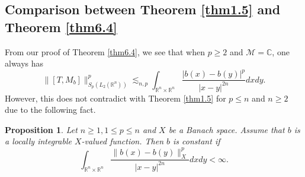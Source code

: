 \documentclass[oneside,english,a4wide]{amsart}
\numberwithin{equation}{section}
\numberwithin{figure}{section}
\theoremstyle{plain}
\theoremstyle{plain}
\newtheorem{proposition}[thm]{Proposition}
\theoremstyle{definition}
\theoremstyle{plain}
\theoremstyle{remark}
\theoremstyle{definition}
\theoremstyle{remark}
\theoremstyle{definition}
\newcommand{\M}{{\mathcal M}}
\newcommand{\8}{\infty}
\begin{document}
\subsection{Comparison between  Theorem \ref{thm1.5} and Theorem \ref{thm6.4}}
From our proof of Theorem \ref{thm6.4}, we see that when $p\geq 2$ and $\M=\mathbb{C}$, one always has
$$ \|[T,M_b]\|^p_{S_p(L_2(\mathbb{R}^n))}\lesssim_{n, p} \int_{\mathbb{R}^n\times\mathbb{R}^n}\frac{|b(x)-b(y)|^p}{|x-y|^{2n}}dxdy. $$
However, this does not contradict with Theorem \ref{thm1.5} for $p\leq n$ and $n\geq 2$ due to the following fact.
\begin{proposition}\label{0pn}
	Let $n\ge 1, 1\leq p\leq n$ and $X$ be a Banach space. Assume that $b$ is a locally integrable $X$-valued function. Then $b$ is constant if
	$$  \int_{\mathbb{R}^n\times\mathbb{R}^n}\frac{\|b(x)-b(y)\|_{X}^p}{|x-y|^{2n}}dxdy<\8. $$
\end{proposition}
\end{document}

